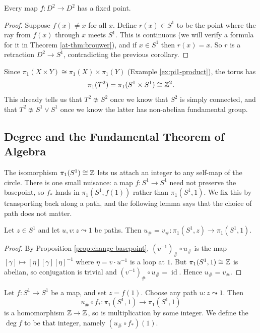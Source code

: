 \documentclass[a4paper]{scrartcl}
\newcommand{\id}{\operatorname{id}}
\begin{document}
\begin{corollary}[Brouwer Fixed Point Theorem, $n=2$]
	Every map $f: D^2 \to D^2$ has a fixed point.
\end{corollary}
\begin{proof}
	Suppose $f(x) \neq x$ for all $x$. Define $r(x) \in S^1$ to be the point where the ray from $f(x)$ through $x$ meets $S^1$. This is continuous (we will verify a formula for it in Theorem \ref{at-thm:brouwer}), and if $x \in S^1$ then $r(x) = x$. So $r$ is a retraction $D^2 \to S^1$, contradicting the previous corollary.
\end{proof}

\begin{example} \label{ex:pi1-torus}
	Since $\pi_1(X \times Y) \cong \pi_1(X) \times \pi_1(Y)$ (Example \ref{ex:pi1-product}), the torus has
	$$
	\pi_1(T^2) = \pi_1(S^1 \times S^1) \cong \mathbb{Z}^2 .
	$$
	This already tells us that $T^2 \not\simeq S^2$ once we know that $S^2$ is simply connected, and that $T^2 \not\simeq S^1 \vee S^1$ once we know the latter has non-abelian fundamental group.
\end{example}

\subsection{Degree and the Fundamental Theorem of Algebra}

The isomorphism $\pi_1(S^1) \cong \mathbb{Z}$ lets us attach an integer to any self-map of the
circle. There is one small nuisance: a map $f: S^1 \to S^1$ need not preserve the
basepoint, so $f_*$ lands in $\pi_1(S^1, f(1))$ rather than $\pi_1(S^1, 1)$. We fix this
by transporting back along a path, and the following lemma says that the choice of path
does not matter.

\begin{lemma} \label{lem:degree-welldefined}
	Let $z \in S^1$ and let $u, v: z \leadsto 1$ be paths. Then $u_\# = v_\#: \pi_1(S^1, z) \to \pi_1(S^1, 1)$.
\end{lemma}
\begin{proof}
	By Proposition \ref{prop:change-basepoint}, $(v^{-1})_\# \circ u_\#$ is the map $[\gamma] \mapsto [\eta][\gamma][\eta]^{-1}$ where $\eta = v \cdot u^{-1}$ is a loop at $1$. But $\pi_1(S^1, 1) \cong \mathbb{Z}$ is abelian, so conjugation is trivial and $(v^{-1})_\# \circ u_\# = \id$. Hence $u_\# = v_\#$.
\end{proof}

\begin{definition}[Degree]
	Let $f: S^1 \to S^1$ be a map, and set $z = f(1)$. Choose any path $u: z \leadsto 1$. Then
	$$
	u_\# \circ f_*: \pi_1(S^1,1) \to \pi_1(S^1,1)
	$$
	is a homomorphism $\mathbb{Z} \to \mathbb{Z}$, so is multiplication by some integer. We define the  $\deg f$ to be that integer, namely $(u_\# \circ f_*)(1)$.
\end{definition}
\end{document}
